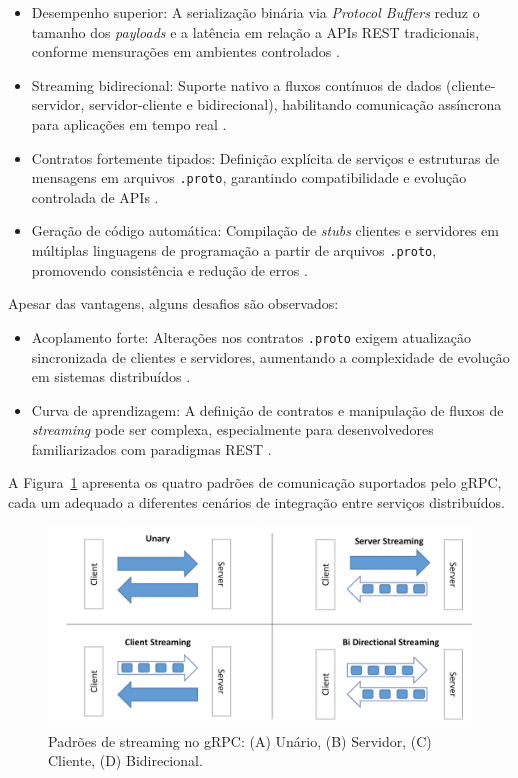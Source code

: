 \begin{itemize}
    \item Desempenho superior: A serialização binária via \textit{Protocol Buffers} reduz o tamanho dos \textit{payloads} e a latência em relação a APIs REST tradicionais, conforme mensurações em ambientes controlados \cite{niswar2023performance}.
    \item Streaming bidirecional: Suporte nativo a fluxos contínuos de dados (cliente-servidor, servidor-cliente e bidirecional), habilitando comunicação assíncrona para aplicações em tempo real \cite{maso2024comparativo}.
    \item Contratos fortemente tipados: Definição explícita de serviços e estruturas de mensagens em arquivos \texttt{.proto}, garantindo compatibilidade e evolução controlada de APIs \cite{shekhar2023microservices}.
    \item Geração de código automática: Compilação de \textit{stubs} clientes e servidores em múltiplas linguagens de programação a partir de arquivos \texttt{.proto}, promovendo consistência e redução de erros \cite{shekhar2023microservices}.
\end{itemize}

Apesar das vantagens, alguns desafios são observados:
\begin{itemize}
    \item Acoplamento forte: Alterações nos contratos \texttt{.proto} exigem atualização sincronizada de clientes e servidores, aumentando a complexidade de evolução em sistemas distribuídos \cite{shekhar2023microservices}.
    \item Curva de aprendizagem: A definição de contratos e manipulação de fluxos de \textit{streaming} pode ser complexa, especialmente para desenvolvedores familiarizados com paradigmas REST \cite{maso2024comparativo}.
\end{itemize}

A Figura~\ref{fig:grpc_streaming} apresenta os quatro padrões de comunicação suportados pelo gRPC, cada um adequado a diferentes cenários de integração entre serviços distribuídos.

\begin{figure}[H]
    \centering
    \includegraphics[width=1.0\textwidth]{images/grpc.png}
    \caption{Padrões de streaming no gRPC: (A) Unário, (B) Servidor, (C) Cliente, (D) Bidirecional.}
    \label{fig:grpc_streaming}
\end{figure}

